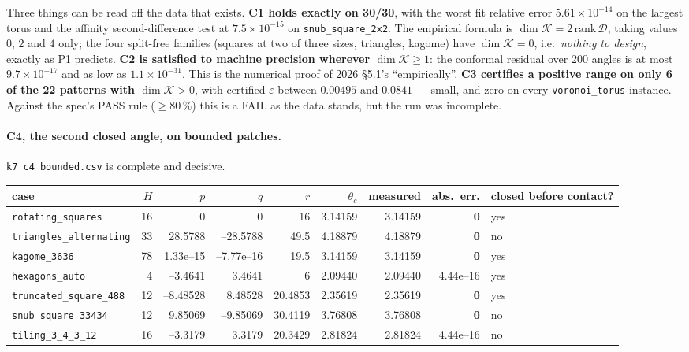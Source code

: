 \documentclass[10pt,a4paper]{article}
\newcommand{\fn}[1]{\nolinkurl{#1}}
\begin{document}
Three things can be read off the data that exists.
\textbf{C1 holds exactly on 30/30}, with the worst fit relative error $5.61\times10^{-14}$ on the
largest torus and the affinity second-difference test at $7.5\times10^{-15}$ on
\fn{snub_square_2x2}. The empirical formula is
$\dim\mathcal K = 2\,\mathrm{rank}\,\mathcal D$, taking values $0$, $2$ and $4$ only; the four
split-free families (squares at two of three sizes, triangles, kagome) have
$\dim\mathcal K = 0$, i.e.\ \emph{nothing to design}, exactly as P1 predicts.
\textbf{C2 is satisfied to machine precision wherever $\dim\mathcal K\ge1$}: the conformal
residual over 200 angles is at most $9.7\times10^{-17}$ and as low as $1.1\times10^{-31}$. This
is the numerical proof of 2026 \S5.1's ``empirically''.
\textbf{C3 certifies a positive range on only 6 of the 22 patterns with $\dim\mathcal K>0$},
with certified $\varepsilon$ between $0.00495$ and $0.0841$ --- small, and zero on every
\fn{voronoi_torus} instance. Against the spec's PASS rule ($\ge80\,\%$) this is a FAIL as the
data stands, but the run was incomplete.

\paragraph{C4, the second closed angle, on bounded patches.} \fn{k7_c4_bounded.csv} is complete
and decisive.

\begin{center}\footnotesize
\begin{tabular}{@{}lrrrrrrrl@{}}
\toprule
case & $H$ & $p$ & $q$ & $r$ & $\theta_c$ & measured & abs.\ err. & closed before contact? \\
\midrule
\fn{rotating_squares} & 16 & 0 & 0 & 16 & 3.14159 & 3.14159 & \textbf{0} & yes \\
\fn{triangles_alternating} & 33 & 28.5788 & --28.5788 & 49.5 & 4.18879 & 4.18879 & \textbf{0} & no \\
\fn{kagome_3636} & 78 & 1.33e--15 & --7.77e--16 & 19.5 & 3.14159 & 3.14159 & \textbf{0} & yes \\
\fn{hexagons_auto} & 4 & --3.4641 & 3.4641 & 6 & 2.09440 & 2.09440 & 4.44e--16 & yes \\
\fn{truncated_square_488} & 12 & --8.48528 & 8.48528 & 20.4853 & 2.35619 & 2.35619 & \textbf{0} & yes \\
\fn{snub_square_33434} & 12 & 9.85069 & --9.85069 & 30.4119 & 3.76808 & 3.76808 & \textbf{0} & no \\
\fn{tiling_3_4_3_12} & 16 & --3.3179 & 3.3179 & 20.3429 & 2.81824 & 2.81824 & 4.44e--16 & no \\
\bottomrule
\end{tabular}
\end{center}
\end{document}
